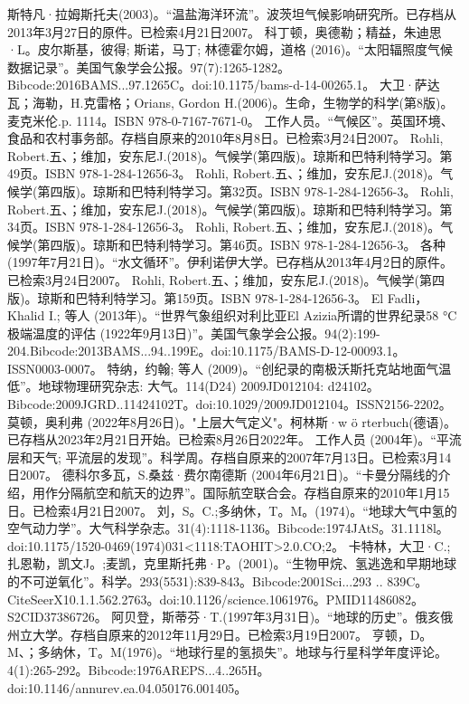 \begin{enumerate}
 斯特凡·拉姆斯托夫(2003)。“温盐海洋环流”。波茨坦气候影响研究所。已存档从2013年3月27日的原件。已检索4月21日2007。
 科丁顿，奥德勒；精益，朱迪思·L。皮尔斯基，彼得; 斯诺，马丁; 林德霍尔姆，道格 (2016)。“太阳辐照度气候数据记录”。美国气象学会公报。97(7):1265-1282。Bibcode:2016BAMS...97.1265C。doi:10.1175/bams-d-14-00265.1。
 大卫·萨达瓦；海勒，H.克雷格；Orians, Gordon H.(2006)。生命，生物学的科学(第8版)。麦克米伦.p. 1114。ISBN 978-0-7167-7671-0。
 工作人员。“气候区”。英国环境、食品和农村事务部。存档自原来的2010年8月8日。已检索3月24日2007。
 Rohli, Robert.五、；维加，安东尼J.(2018)。气候学(第四版)。琼斯和巴特利特学习。第49页。ISBN 978-1-284-12656-3。
 Rohli, Robert.五、；维加，安东尼J.(2018)。气候学(第四版)。琼斯和巴特利特学习。第32页。ISBN 978-1-284-12656-3。
 Rohli, Robert.五、；维加，安东尼J.(2018)。气候学(第四版)。琼斯和巴特利特学习。第34页。ISBN 978-1-284-12656-3。
 Rohli, Robert.五、；维加，安东尼J.(2018)。气候学(第四版)。琼斯和巴特利特学习。第46页。ISBN 978-1-284-12656-3。
 各种 (1997年7月21日)。“水文循环”。伊利诺伊大学。已存档从2013年4月2日的原件。已检索3月24日2007。
 Rohli, Robert.五、；维加，安东尼J.(2018)。气候学(第四版)。琼斯和巴特利特学习。第159页。ISBN 978-1-284-12656-3。
 El Fadli，Khalid I.; 等人 (2013年)。“世界气象组织对利比亚El Azizia所谓的世界纪录58 °C极端温度的评估 (1922年9月13日)”。美国气象学会公报。94(2):199-204.Bibcode:2013BAMS...94..199E。doi:10.1175/BAMS-D-12-00093.1。ISSN0003-0007。 
 特纳，约翰; 等人 (2009)。“创纪录的南极沃斯托克站地面气温低”。地球物理研究杂志: 大气。114(D24) 2009JD012104: d24102。Bibcode:2009JGRD..11424102T。doi:10.1029/2009JD012104。ISSN2156-2202。 
 莫顿，奥利弗 (2022年8月26日)。"上层大气定义"。柯林斯·w ö rterbuch(德语)。已存档从2023年2月21日开始。已检索8月26日2022年。
 工作人员 (2004年)。“平流层和天气; 平流层的发现”。科学周。存档自原来的2007年7月13日。已检索3月14日2007。
 德科尔多瓦，S.桑兹·费尔南德斯 (2004年6月21日)。“卡曼分隔线的介绍，用作分隔航空和航天的边界”。国际航空联合会。存档自原来的2010年1月15日。已检索4月21日2007。
 刘，S。C.;多纳休，T。M。(1974)。“地球大气中氢的空气动力学”。大气科学杂志。31(4):1118-1136。Bibcode:1974JAtS。31.1118l。doi:10.1175/1520-0469(1974)031<1118:TAOHIT>2.0.CO;2。
 卡特林，大卫·C.;扎恩勒，凯文J。;麦凯，克里斯托弗·P。(2001)。“生物甲烷、氢逃逸和早期地球的不可逆氧化”。科学。293(5531):839-843。Bibcode:2001Sci...293 .. 839C。CiteSeerX10.1.1.562.2763。doi:10.1126/science.1061976。PMID11486082。S2CID37386726。   
 阿贝登，斯蒂芬·T.(1997年3月31日)。“地球的历史”。俄亥俄州立大学。存档自原来的2012年11月29日。已检索3月19日2007。
 亨顿，D。M、；多纳休，T。M(1976)。“地球行星的氢损失”。地球与行星科学年度评论。4(1):265-292。Bibcode:1976AREPS...4..265H。doi:10.1146/annurev.ea.04.050176.001405。

\end{enumerate}
